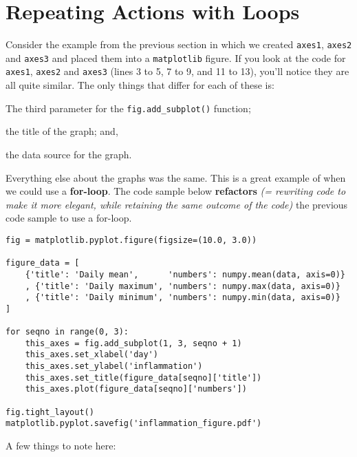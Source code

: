 \section{Repeating Actions with Loops}
\begin{multicols*}{2}

Consider the example from the previous section in which we created \texttt{axes1}, \texttt{axes2} and \texttt{axes3} and placed them into a \texttt{matplotlib} figure. If you look at the code for \texttt{axes1}, \texttt{axes2} and \texttt{axes3} (lines 3 to 5, 7 to 9, and 11 to 13), you'll notice they are all quite similar. The only things that differ for each of these is:

\begin{myitemize}
    \item The third parameter for the \texttt{fig.add_subplot()} function;
    \item the title of the graph; and,
    \item the data source for the graph.
\end{myitemize}

Everything else about the graphs was the same. This is a great example of when we could use a \textbf{for-loop}. The code sample below \textbf{refactors} \textit{(= rewriting code to make it more elegant, while retaining the same outcome of the code)} the previous code sample to use a for-loop.

\vspace{-4mm}
\begin{verbatim}
fig = matplotlib.pyplot.figure(figsize=(10.0, 3.0))

figure_data = [
    {'title': 'Daily mean',      'numbers': numpy.mean(data, axis=0)}
    , {'title': 'Daily maximum', 'numbers': numpy.max(data, axis=0)}
    , {'title': 'Daily minimum', 'numbers': numpy.min(data, axis=0)}
]

for seqno in range(0, 3):
    this_axes = fig.add_subplot(1, 3, seqno + 1)
    this_axes.set_xlabel('day')
    this_axes.set_ylabel('inflammation')
    this_axes.set_title(figure_data[seqno]['title'])
    this_axes.plot(figure_data[seqno]['numbers'])

fig.tight_layout()
matplotlib.pyplot.savefig('inflammation_figure.pdf')
\end{verbatim}

\par
A few things to note here:


\end{multicols*}
